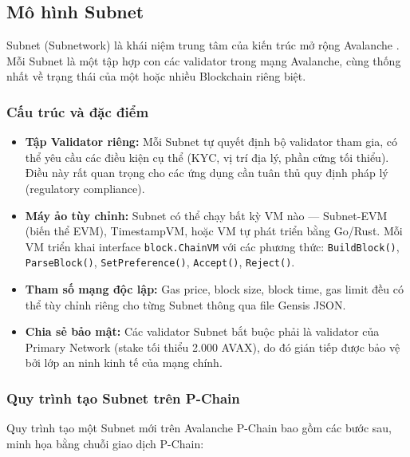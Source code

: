 \subsection{Mô hình Subnet}

Subnet (Subnetwork) là khái niệm trung tâm của kiến trúc mở rộng Avalanche \cite{avalabs2023subnets}. Mỗi Subnet là một tập hợp con các validator trong mạng Avalanche, cùng thống nhất về trạng thái của một hoặc nhiều Blockchain riêng biệt.

\subsubsection{Cấu trúc và đặc điểm}

\begin{itemize}
    \item \textbf{Tập Validator riêng:} Mỗi Subnet tự quyết định bộ validator tham gia, có thể yêu cầu các điều kiện cụ thể (KYC, vị trí địa lý, phần cứng tối thiểu). Điều này rất quan trọng cho các ứng dụng cần tuân thủ quy định pháp lý (regulatory compliance).

    \item \textbf{Máy ảo tùy chỉnh:} Subnet có thể chạy bất kỳ VM nào --- Subnet-EVM (biến thể EVM), TimestampVM, hoặc VM tự phát triển bằng Go/Rust. Mỗi VM triển khai interface \texttt{block.ChainVM} với các phương thức: \texttt{BuildBlock()}, \texttt{ParseBlock()}, \texttt{SetPreference()}, \texttt{Accept()}, \texttt{Reject()}.

    \item \textbf{Tham số mạng độc lập:} Gas price, block size, block time, gas limit đều có thể tùy chỉnh riêng cho từng Subnet thông qua file Gensis JSON.

    \item \textbf{Chia sẻ bảo mật:} Các validator Subnet bắt buộc phải là validator của Primary Network (stake tối thiểu 2.000 AVAX), do đó gián tiếp được bảo vệ bởi lớp an ninh kinh tế của mạng chính.
\end{itemize}

\subsubsection{Quy trình tạo Subnet trên P-Chain}

Quy trình tạo một Subnet mới trên Avalanche P-Chain bao gồm các bước sau, minh họa bằng chuỗi giao dịch P-Chain:

